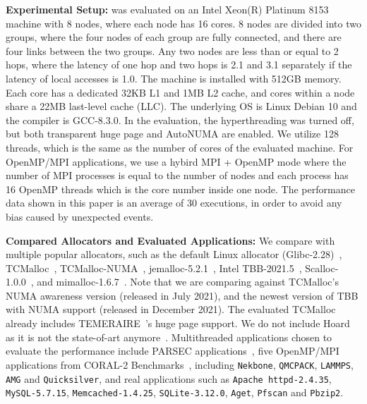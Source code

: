 \textbf{Experimental Setup:}  \NM{} was evaluated on an Intel Xeon(R) Platinum 8153 machine with 8 nodes, where each node has 16 cores. 8 nodes are divided into two groups, where the four nodes of each group are fully connected, and there are four links between the two groups. Any two nodes are less than or equal to 2 hops, where the latency of one hop and two hops is 2.1 and 3.1 separately if the latency of local accesses is 1.0. The machine is installed with 512GB memory. Each core has a dedicated 32KB L1 and 1MB L2 cache, and cores within a node share a 22MB last-level cache (LLC). The underlying OS is Linux Debian 10 and the compiler is GCC-8.3.0. In the evaluation, the hyperthreading was turned off, but both transparent huge page and AutoNUMA are enabled. We utilize 128 threads, which is the same as the number of cores of the evaluated machine. For OpenMP/MPI applications, we use a hybird MPI + OpenMP mode where the number of MPI processes is equal to the number of nodes and each process has 16 OpenMP threads which is the core number inside one node. The performance data shown in this paper is an average of 30 executions, in order to avoid any bias caused by unexpected events.


\textbf{Compared Allocators and Evaluated Applications: }  We compare \NM{} with multiple popular allocators, such as the default Linux allocator (Glibc-2.28)~\cite{glibcweb}, TCMalloc~\cite{tcmalloc2},  TCMalloc-NUMA~\cite{tcmallocnuma}, jemalloc-5.2.1~\cite{jemalloc}, Intel TBB-2021.5~\cite{tbb2}, Scalloc-1.0.0~\cite{Scalloc}, and mimalloc-1.6.7~\cite{mimalloc}. Note that we are comparing against TCMalloc's NUMA awareness version (released in July 2021), and the newest version of TBB with NUMA support (released in December 2021). The evaluated TCMalloc already includes TEMERAIRE~\cite{TEMERAIRE}'s huge page support. 
We do not include Hoard~\cite{Hoard} as it is not the state-of-art anymore~\cite{Scalloc, mimalloc}. Multithreaded applications chosen to evaluate the performance include PARSEC applications~\cite{parsec}, five OpenMP/MPI applications from CORAL-2 Benchmarks~\cite{coral2}, including \texttt{Nekbone}, \texttt{QMCPACK}, \texttt{LAMMPS}, \texttt{AMG} and \texttt{Quicksilver}, and real applications such as \texttt{Apache httpd-2.4.35}, \texttt{MySQL-5.7.15}, \texttt{Memcached-1.4.25}, \texttt{SQLite-3.12.0}, \texttt{Aget}, \texttt{Pfscan} and \texttt{Pbzip2}.

